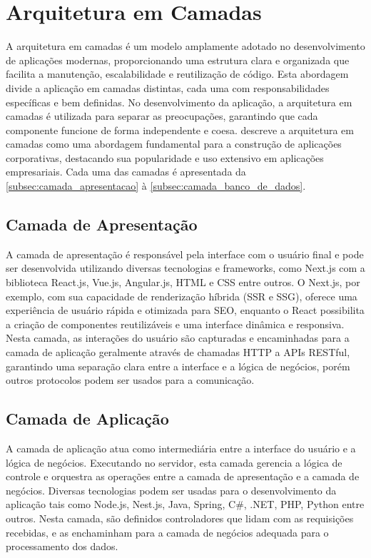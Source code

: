 \section{Arquitetura em Camadas}

A arquitetura em camadas é um modelo amplamente adotado no desenvolvimento de aplicações modernas, proporcionando uma estrutura clara e organizada que facilita a manutenção, escalabilidade e reutilização de código. Esta abordagem divide a aplicação em camadas distintas, cada uma com responsabilidades específicas e bem definidas. No desenvolvimento da aplicação, a arquitetura em camadas é utilizada para separar as preocupações, garantindo que cada componente funcione de forma independente e coesa. \cite{Fowler02} descreve a arquitetura em camadas como uma abordagem fundamental para a construção de aplicações corporativas, destacando sua popularidade e uso extensivo em aplicações empresariais. Cada uma das camadas é apresentada da \autoref{subsec:camada_apresentacao} à \autoref{subsec:camada_banco_de_dados}.

\subsection{Camada de Apresentação}\label{subsec:camada_apresentacao}

A camada de apresentação é responsável pela interface com o usuário final e pode ser desenvolvida utilizando diversas tecnologias e frameworks, como Next.js com a biblioteca React.js, Vue.js, Angular.js, HTML e CSS entre outros. O Next.js, por exemplo, com sua capacidade de renderização híbrida (SSR e SSG), oferece uma experiência de usuário rápida e otimizada para SEO, enquanto o React possibilita a criação de componentes reutilizáveis e uma interface dinâmica e responsiva. Nesta camada, as interações do usuário são capturadas e encaminhadas para a camada de aplicação geralmente através de chamadas HTTP a APIs RESTful, garantindo uma separação clara entre a interface e a lógica de negócios, porém outros protocolos podem ser usados para a comunicação.

\subsection{Camada de Aplicação}

A camada de aplicação atua como intermediária entre a interface do usuário e a lógica de negócios. Executando no servidor, esta camada gerencia a lógica de controle e orquestra as operações entre a camada de apresentação e a camada de negócios. Diversas tecnologias podem ser usadas para o desenvolvimento da aplicação tais como Node.js, Nest.js, Java, Spring, C\#, .NET, PHP, Python entre outros. Nesta camada, são definidos controladores que lidam com as requisições recebidas, e as enchaminham para a camada de negócios adequada para o processamento dos dados.

